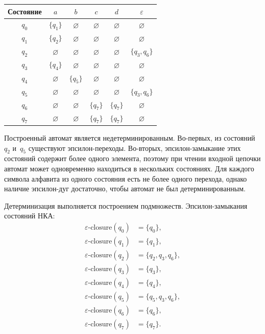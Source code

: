 \begin{center}
	\begin{minipage}{\textwidth}
	\centering
	\begin{tabular}{|c|c|c|c|c|c|}
		\hline
		Состояние & $a$ & $b$ & $c$ & $d$ & $\varepsilon$ \\
		\hline
		$q_{0}$ & $\{q_{1}\}$ & $\varnothing$ & $\varnothing$ & $\varnothing$ & $\varnothing$ \\
		\hline
		$q_{1}$ & $\{q_{2}\}$ & $\varnothing$ & $\varnothing$ & $\varnothing$ & $\varnothing$ \\
		\hline
		$q_{2}$ & $\varnothing$ & $\varnothing$ & $\varnothing$ & $\varnothing$ & $\{q_{3}, q_{6}\}$ \\
		\hline
		$q_{3}$ & $\{q_{4}\}$ & $\varnothing$ & $\varnothing$ & $\varnothing$ & $\varnothing$ \\
		\hline
		$q_{4}$ & $\varnothing$ & $\{q_{5}\}$ & $\varnothing$ & $\varnothing$ & $\varnothing$ \\
		\hline
		$q_{5}$ & $\varnothing$ & $\varnothing$ & $\varnothing$ & $\varnothing$ & $\{q_{3}, q_{6}\}$ \\
		\hline
		$q_{6}$ & $\varnothing$ & $\varnothing$ & $\{q_{7}\}$ & $\{q_{7}\}$ & $\varnothing$ \\
		\hline
		$q_{7}$ & $\varnothing$ & $\varnothing$ & $\{q_{7}\}$ & $\{q_{7}\}$ & $\varnothing$ \\
		\hline
	\end{tabular}
	\label{tab:nfa}
	\end{minipage}
\end{center}

Построенный автомат является недетерминированным. Во-первых, из состояний~$q_{2}$ и~$q_{5}$ существуют эпсилон-переходы. Во-вторых, эпсилон-замыкание этих состояний содержит более одного элемента, поэтому при чтении входной цепочки автомат может одновременно находиться в нескольких состояниях. Для каждого символа алфавита из одного состояния есть не более одного перехода, однако наличие эпсилон-дуг достаточно, чтобы автомат не был детерминированным.

Детерминизация выполняется построением подмножеств. Эпсилон-замыкания состояний НКА:
\begin{align*}
	\varepsilon\text{-closure}(q_{0}) &= \{q_{0}\}, \\
	\varepsilon\text{-closure}(q_{1}) &= \{q_{1}\}, \\
	\varepsilon\text{-closure}(q_{2}) &= \{q_{2}, q_{3}, q_{6}\}, \\
	\varepsilon\text{-closure}(q_{3}) &= \{q_{3}\}, \\
	\varepsilon\text{-closure}(q_{4}) &= \{q_{4}\}, \\
	\varepsilon\text{-closure}(q_{5}) &= \{q_{5}, q_{3}, q_{6}\}, \\
	\varepsilon\text{-closure}(q_{6}) &= \{q_{6}\}, \\
	\varepsilon\text{-closure}(q_{7}) &= \{q_{7}\}.
\end{align*}


